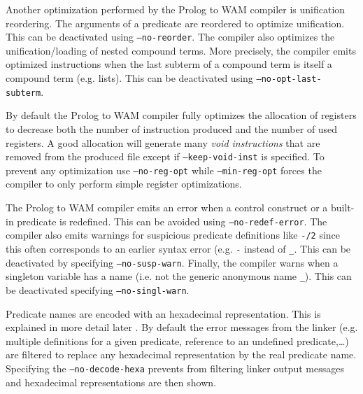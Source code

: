 Another optimization performed by the Prolog to WAM compiler is unification
reordering. The arguments of a predicate are reordered to optimize
unification. This can be deactivated using \texttt{--no-reorder}. The
compiler also optimizes the unification/loading of nested compound terms.
More precisely, the compiler emits optimized instructions when the last
subterm of a compound term is itself a compound term (e.g. lists). This can
be deactivated using \texttt{--no-opt-last-subterm}.

By default the Prolog to WAM compiler fully optimizes the allocation of
registers to decrease both the number of instruction produced and the number
of used registers. A good allocation will generate many \emph{void
instructions} that are removed from the produced file except if
\texttt{--keep-void-inst} is specified. To prevent any optimization use
\texttt{--no-reg-opt} while \texttt{--min-reg-opt} forces the compiler to
only perform simple register optimizations.

The Prolog to WAM compiler emits an error when a control construct or a
built-in predicate is redefined. This can be avoided using
\texttt{--no-redef-error}. The compiler also emits warnings for suspicious
predicate definitions like \texttt{-/2} since this often corresponds to an
earlier syntax error (e.g. \texttt{-} instead of \texttt{\_}. This can be
deactivated by specifying \texttt{--no-susp-warn}. Finally, the compiler
warns when a singleton variable has a name (i.e. not the generic anonymous
name \texttt{\_}). This can be deactivated specifying
\texttt{--no-singl-warn}. 

Predicate names are encoded with an hexadecimal representation. This is
explained in more detail later . By default the error messages from the linker (e.g. multiple
definitions for a given predicate, reference to an undefined
predicate,\ldots) are filtered to replace any hexadecimal representation
by the real predicate name. Specifying the \texttt{--no-decode-hexa}
prevents  from filtering linker output messages and hexadecimal
representations are then shown.

